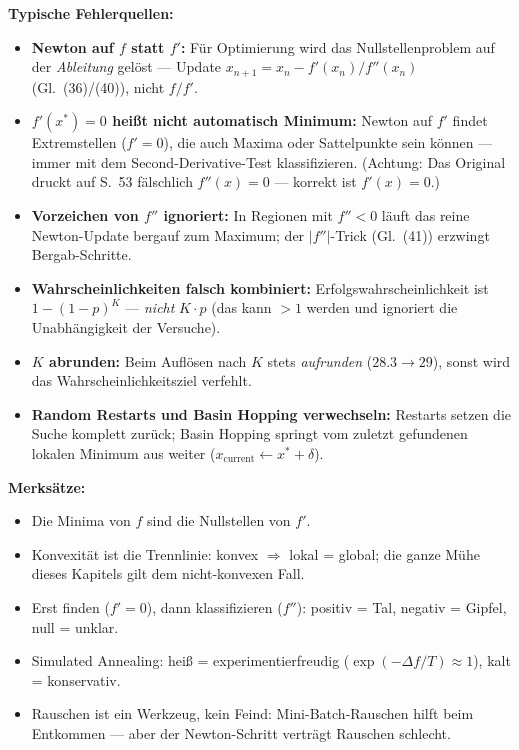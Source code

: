 \begin{merkbox}
\textbf{Typische Fehlerquellen:}
\begin{itemize}[itemsep=1pt]
  \item \textbf{Newton auf $f$ statt $f'$:} Für Optimierung wird das
        Nullstellenproblem auf der \emph{Ableitung} gelöst --- Update
        $x_{n+1} = x_n - f'(x_n)/f''(x_n)$ (Gl.~(36)/(40)), nicht $f/f'$.
  \item \textbf{$f'(x^{*})=0$ hei{\ss}t nicht automatisch Minimum:} Newton auf $f'$
        findet Extremstellen ($f'=0$), die auch Maxima oder Sattelpunkte sein können
        --- immer mit dem Second-Derivative-Test klassifizieren. (Achtung: Das
        Original druckt auf S.~53 fälschlich \glqq $f''(x)=0$\grqq{} --- korrekt ist
        $f'(x)=0$.)
  \item \textbf{Vorzeichen von $f''$ ignoriert:} In Regionen mit $f''<0$ läuft das
        reine Newton-Update bergauf zum Maximum; der $|f''|$-Trick (Gl.~(41))
        erzwingt Bergab-Schritte.
  \item \textbf{Wahrscheinlichkeiten falsch kombiniert:} Erfolgswahrscheinlichkeit ist
        $1-(1-p)^K$ --- \emph{nicht} $K \cdot p$ (das kann $>1$ werden und ignoriert
        die Unabhängigkeit der Versuche).
  \item \textbf{$K$ abrunden:} Beim Auflösen nach $K$ stets \emph{aufrunden}
        ($28.3 \to 29$), sonst wird das Wahrscheinlichkeitsziel verfehlt.
  \item \textbf{Random Restarts und Basin Hopping verwechseln:} Restarts setzen die
        Suche komplett zurück; Basin Hopping springt vom zuletzt gefundenen lokalen
        Minimum aus weiter ($x_{\text{current}} \gets x^{*} + \delta$).
\end{itemize}
\textbf{Merksätze:}
\begin{itemize}[itemsep=1pt]
  \item \glqq Die Minima von $f$ sind die Nullstellen von $f'$.\grqq
  \item Konvexität ist die Trennlinie: konvex $\Rightarrow$ lokal = global; die ganze
        Mühe dieses Kapitels gilt dem nicht-konvexen Fall.
  \item Erst finden ($f'=0$), dann klassifizieren ($f''$): positiv = Tal, negativ =
        Gipfel, null = unklar.
  \item Simulated Annealing: hei{\ss} = experimentierfreudig
        ($\exp(-\Delta f/T) \approx 1$), kalt = konservativ.
  \item Rauschen ist ein Werkzeug, kein Feind: Mini-Batch-Rauschen hilft beim
        Entkommen --- aber der Newton-Schritt verträgt Rauschen schlecht.
\end{itemize}
\end{merkbox}

